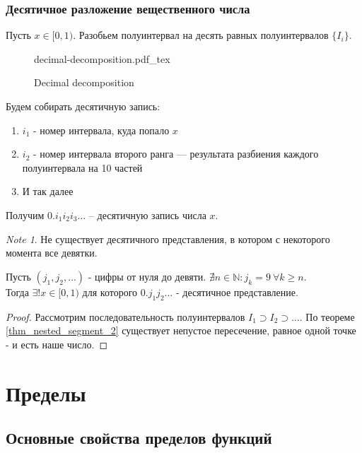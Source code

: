 \documentclass[11pt]{book}
\newcommand{\incfig}[1]{%
    \def\svgwidth{\columnwidth}
    {#1.pdf_tex}
}
\newcommand{\N}{\mathbb{N}}
\renewcommand{\ge}{\geqslant}
\theoremstyle{definition}
\theoremstyle{plain}
\theoremstyle{plain}
\theoremstyle{definition}
\theoremstyle{remark}
\newtheorem*{note}{Note}
\begin{document}
\subsection{Десятичное разложение вещественного числа}\label{ques_13}
Пусть $x \in  [0, 1)$. Разобьем полуинтервал на десять равных полуинтервалов $\{I_i\}$.
\begin{figure}[ht]
    \centering
    \incfig{decimal-decomposition}
    \caption{Decimal decomposition}
    \label{fig:decimal-decomposition}
\end{figure}
Будем собирать десятичную запись:
\begin{enumerate}
    \item $i_1$  - номер интервала, куда попало $x$ 
    \item $i_2$ - номер интервала второго ранга --- результата разбиения каждого полуинтервала на 10 частей
    \item
	И так далее
\end{enumerate}
Получим $0.i_1i_2i_3 \ldots $ -- десятичную запись числа $x$.
\begin{note}
    Не существует десятичного представления, в котором с некоторого момента все девятки.
\end{note}
\begin{thm}
    Пусть $(j_1, j_2, \ldots )$ - цифры от нуля до девяти. $\nexists n \in \N: j_k = 9 ~ \forall k \ge n$.\\
    Тогда $\exists ! x \in [0, 1) $ для которого $0.j_1j_2 \ldots $ - десятичное представление.
\end{thm}
\begin{proof}
    Рассмотрим последовательность полуинтервалов $I_1 \supset I_2 \supset \ldots $. По теореме \ref{thm_nested_segment_2} существует непустое пересечение, равное одной точке - и есть наше число.
\end{proof}
\chapter{Пределы}
\section{Основные свойства пределов функций}
\end{document}
